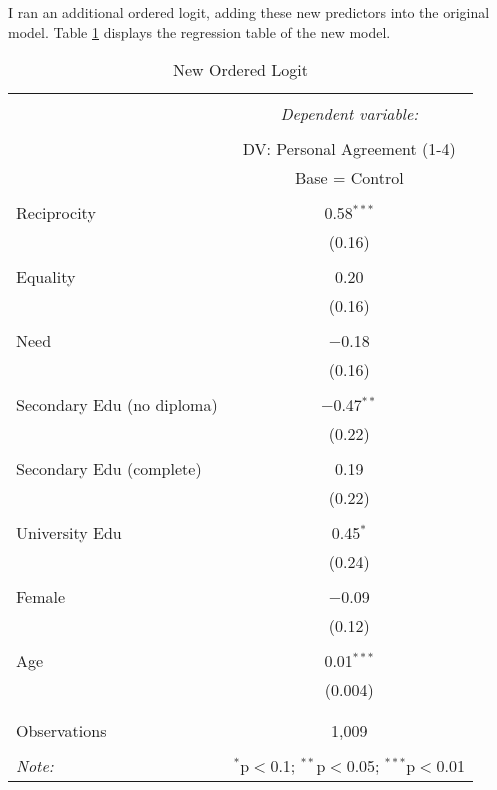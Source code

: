 \documentclass{article}
\begin{document}
I ran an additional ordered logit, adding these new predictors into the original model. Table \ref{tab:new_ordered_logit} displays the regression table of the new model.

\begin{table}[!htbp] \centering 
  \caption{New Ordered Logit} 
  \label{tab:new_ordered_logit} 
\begin{tabular}{@{\extracolsep{5pt}}lc} 
\\[-1.8ex]\hline 
\hline \\[-1.8ex] 
 & \multicolumn{1}{c}{\textit{Dependent variable:}} \\ 
\cline{2-2} 
\\[-1.8ex] & DV: Personal Agreement (1-4) \\ 
 & Base = Control \\ 
\hline \\[-1.8ex] 
 Reciprocity & 0.58$^{***}$ \\ 
  & (0.16) \\ 
  & \\ 
 Equality & 0.20 \\ 
  & (0.16) \\ 
  & \\ 
 Need & $-$0.18 \\ 
  & (0.16) \\ 
  & \\ 
 Secondary Edu (no diploma) & $-$0.47$^{**}$ \\ 
  & (0.22) \\ 
  & \\ 
 Secondary Edu (complete) & 0.19 \\ 
  & (0.22) \\ 
  & \\ 
 University Edu & 0.45$^{*}$ \\ 
  & (0.24) \\ 
  & \\ 
 Female & $-$0.09 \\ 
  & (0.12) \\ 
  & \\ 
 Age & 0.01$^{***}$ \\ 
  & (0.004) \\ 
  & \\ 
\hline \\[-1.8ex] 
Observations & 1,009 \\ 
\hline 
\hline \\[-1.8ex] 
\textit{Note:}  & \multicolumn{1}{r}{$^{*}$p$<$0.1; $^{**}$p$<$0.05; $^{***}$p$<$0.01} \\ 
\end{tabular} 
\end{table}
\end{document}
